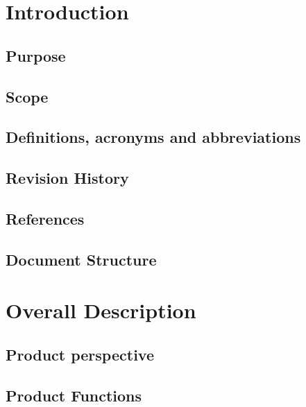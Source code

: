 


  \begin{titlepage}
  
  \end{titlepage}
  
  \tableofcontents
   
  \chapter{Introduction}
  \section{Purpose}
  
  \section{Scope}
  
  \section{Definitions, acronyms and abbreviations}
  
  \section{Revision History}
  
  \section{References}
  
  \section{Document Structure}
  
  
  \chapter{Overall Description}
  \section{Product perspective}
  
  \section{Product Functions}
  
